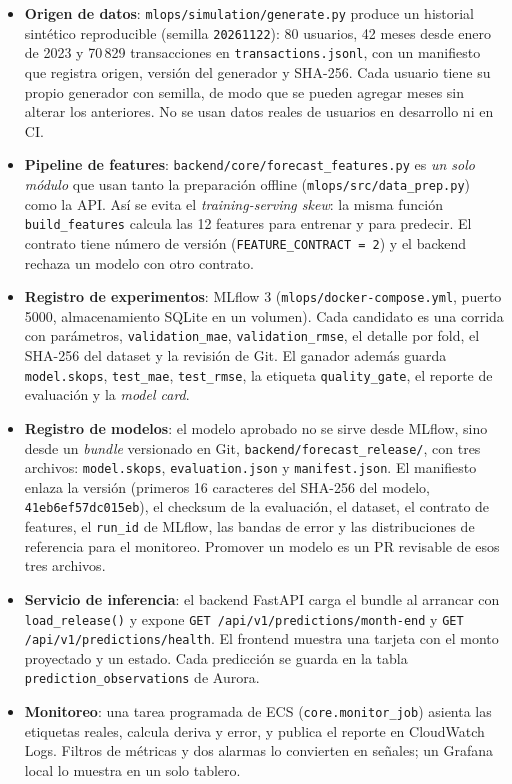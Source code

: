 \begin{itemize}
    \item \textbf{Origen de datos}: \texttt{mlops/simulation/generate.py} produce un historial sintético reproducible (semilla \texttt{20261122}): 80 usuarios, 42 meses desde enero de 2023 y 70\,829 transacciones en \texttt{transactions.jsonl}, con un manifiesto que registra origen, versión del generador y SHA-256. Cada usuario tiene su propio generador con semilla, de modo que se pueden agregar meses sin alterar los anteriores. No se usan datos reales de usuarios en desarrollo ni en CI.
    \item \textbf{Pipeline de features}: \texttt{backend/core/forecast\_features.py} es \emph{un solo módulo} que usan tanto la preparación offline (\texttt{mlops/src/data\_prep.py}) como la API. Así se evita el \textit{training-serving skew}: la misma función \texttt{build\_features} calcula las 12 features para entrenar y para predecir. El contrato tiene número de versión (\texttt{FEATURE\_CONTRACT = 2}) y el backend rechaza un modelo con otro contrato.
    \item \textbf{Registro de experimentos}: MLflow 3 (\texttt{mlops/docker-compose.yml}, puerto 5000, almacenamiento SQLite en un volumen). Cada candidato es una corrida con parámetros, \texttt{validation\_mae}, \texttt{validation\_rmse}, el detalle por fold, el SHA-256 del dataset y la revisión de Git. El ganador además guarda \texttt{model.skops}, \texttt{test\_mae}, \texttt{test\_rmse}, la etiqueta \texttt{quality\_gate}, el reporte de evaluación y la \textit{model card}.
    \item \textbf{Registro de modelos}: el modelo aprobado no se sirve desde MLflow, sino desde un \textit{bundle} versionado en Git, \texttt{backend/forecast\_release/}, con tres archivos: \texttt{model.skops}, \texttt{evaluation.json} y \texttt{manifest.json}. El manifiesto enlaza la versión (primeros 16 caracteres del SHA-256 del modelo, \texttt{41eb6ef57dc015eb}), el checksum de la evaluación, el dataset, el contrato de features, el \texttt{run\_id} de MLflow, las bandas de error y las distribuciones de referencia para el monitoreo. Promover un modelo es un PR revisable de esos tres archivos.
    \item \textbf{Servicio de inferencia}: el backend FastAPI carga el bundle al arrancar con \texttt{load\_release()} y expone \texttt{GET /api/v1/predictions/month-end} y \texttt{GET /api/v1/predictions/health}. El frontend muestra una tarjeta con el monto proyectado y un estado. Cada predicción se guarda en la tabla \texttt{prediction\_observations} de Aurora.
    \item \textbf{Monitoreo}: una tarea programada de ECS (\texttt{core.monitor\_job}) asienta las etiquetas reales, calcula deriva y error, y publica el reporte en CloudWatch Logs. Filtros de métricas y dos alarmas lo convierten en señales; un Grafana local lo muestra en un solo tablero.
\end{itemize}


